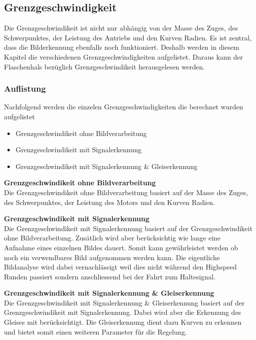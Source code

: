 \documentclass[../../main.tex]{subfiles}
\begin{document}
\subsection{Grenzgeschwindigkeit}
Die Grenzgeschwindikeit ist nicht nur abhängig von der Masse des Zuges, des Schwerpunktes, der Leistung des Antriebs und den Kurven Radien.
Es ist zentral, dass die Bilderkennung ebenfalls noch funktioniert. Deshalb werden in diesem Kapitel die verschiedenen Grenzgeschwindigkeiten aufgelistet.
Daraus kann der Flaschenhals bezüglich Grenzgeschwindikeit herausgelesen werden.

\subsubsection{Auflistung}
Nachfolgend werden die einzelen Grenzgeschwindigkeiten die berechnet wurden aufgelistet
\begin{itemize} %
    \item Grenzgeschwindikeit ohne Bildverarbeitung
    \item Grenzgeschwindikeit mit Signalerkennung
    \item Grenzgeschwindikeit mit Signalerkennung \& Gleiserkennung
\end{itemize}

\textbf{Grenzgeschwindikeit ohne Bildverarbeitung} \\
Die Grenzgeschwindikeit ohne Bildverarbeitung basiert auf der Masse des Zuges, des Schwerpunktes, der Leistung des Motors und den Kurven Radien.

\textbf{Grenzgeschwindikeit mit Signalerkennung} \\
Die Grenzgeschwindikeit mit Signalerkennung basiert auf der Grenzgeschwindikeit ohne Bildverarbeitung. Zusätlich wird aber berücksichtig wie lange eine
Aufnahme eines einzelnen Bildes dauert. Somit kann gewährleistet werden ob noch ein verwendbares Bild aufgenommen werden kann. Die eigentliche Bildanalyse
wird dabei vernachlässigt weil dies nicht während den Highspeed Runden passiert sondern anschliessend bei der Fahrt zum Haltesignal.

\textbf{Grenzgeschwindikeit mit Signalerkennung \& Gleiserkennung} \\
Die Grenzgeschwindikeit mit Signalerkennung \& Gleiserkennung basiert auf der Grenzgeschwindikeit mit Signalerkennung. Dabei wird aber die Erkennung des Gleises
mit berücksichtigt. Die Gleiserkennung dient dazu Kurven zu erkennen und bietet somit einen weiteren Parameter für die Regelung.
\end{document}
